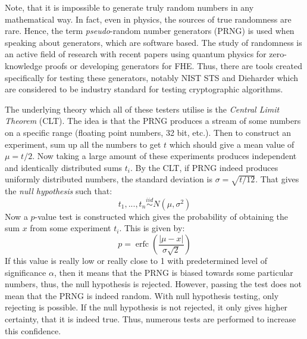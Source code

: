 \documentclass{Resources/UoBLab1}
\theoremstyle{definition}
\begin{document}
Note, that it is impossible to generate truly random numbers in any mathematical way. In fact, even in physics, the sources of true randomness are rare. Hence, the term \textit{pseudo}-random number generators (PRNG) is used when speaking about generators, which are software based. The study of randomness is an active field of research with recent papers using quantum physics for zero-knowledge proofs\cite{QuantumZK} or developing generators for FHE\cite{LatticeRNG}. Thus, there are tools created specifically for testing these generators, notably NIST STS\cite{NIST} and Dieharder\cite{Dieharder} which are considered to be industry standard for testing cryptographic algorithms\cite{AESNI}.

The underlying theory which all of these testers utilise is the \textit{Central Limit Theorem} (CLT). The idea is that the PRNG produces a stream of some numbers on a specific range (floating point numbers, 32 bit, etc.). Then to construct an experiment, sum up all the numbers to get $t$ which should give a mean value of $\mu = t/2$. Now taking a large amount of these experiments produces independent and identically distributed sums $t_i$. By the CLT, if PRNG indeed produces uniformly distributed numbers, the standard deviation is $\sigma = \sqrt{t/12}$. That gives the \textit{null hypothesis} such that:
\[
    t_1, ..., t_n \overset{iid}{\sim} N(\mu, \sigma^2)
\]
Now a $p$-value test is constructed which gives the probability of obtaining the sum $x$ from some experiment $t_i$. This is given by:
\[
    p = \operatorname{erfc}\left(\frac{|\mu - x|}{\sigma\sqrt{2}}\right)
\]
If this value is really low or really close to 1 with predetermined level of significance $\alpha$, then it means that the PRNG is biased towards some particular numbers, thus, the null hypothesis is rejected. However, passing the test does not mean that the PRNG is indeed random. With null hypothesis testing, only rejecting is possible. If the null hypothesis is not rejected, it only gives higher certainty, that it is indeed true. Thus, numerous tests are performed to increase this confidence.\medskip
\end{document}
